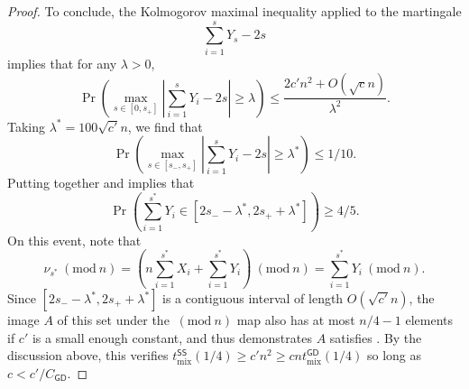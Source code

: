 \documentclass[11pt]{article}
\newcommand{\Mod}[1]{\ (\mathrm{mod}\ #1)}
\begin{document}
\begin{proof}
    To conclude, the Kolmogorov maximal inequality applied to the martingale
    \begin{equation*}
        \sum_{i=1}^s Y_s-2s
    \end{equation*}
    implies that for any $\lambda>0$,
    \begin{equation*}
        \Pr\left(\max_{s\in [0,s_+]} \left\vert \sum_{i=1}^s Y_i-2s\right\vert\geq \lambda\right)\leq \frac{2c'n^2+O(\sqrt{c}n)}{\lambda^2}.
    \end{equation*}
    Taking $\lambda^* = 100\sqrt{c'}n$, we find that
    \begin{equation}
    \label{eq:good_y}
        \Pr\left(\max_{s\in [s_-,s_+]} \left\vert \sum_{i=1}^s Y_i-2s\right\vert\geq \lambda^*\right)\leq 1/10.
    \end{equation}
    Putting together  and  implies that
    \begin{equation}
    \label{eq:good_A}
        \Pr\left(\sum_{i=1}^{s^*} Y_i \in [2s_--\lambda^*,2s_++\lambda^*]\right)\geq 4/5.
    \end{equation}
    On this event, note that
    \begin{equation*}
        \nu_{s^*}\Mod n = \left(n\sum_{i=1}^{s^*} X_i+\sum_{i=1}^{s^*} Y_i\right)\Mod n=\sum_{i=1}^{s^*} Y_i\Mod n.
    \end{equation*}
    Since $[2s_--\lambda^*,2s_++\lambda^*]$ is a contiguous interval of length $O(\sqrt{c'}n)$, the image $A$ of this set under the $\Mod n$ map also has at most $n/4-1$ elements if $c'$ is a small enough constant, and thus  demonstrates $A$ satisfies . By the discussion above, this verifies $t^{\mathsf{SS}}_{\mathrm{mix}}(1/4)\geq c'n^2\geq cnt_{\mathrm{mix}}^{\mathsf{GD}}(1/4)$
    so long as $c< c'/C_{\mathsf{GD}}$.
    
\end{proof}



\end{document}
